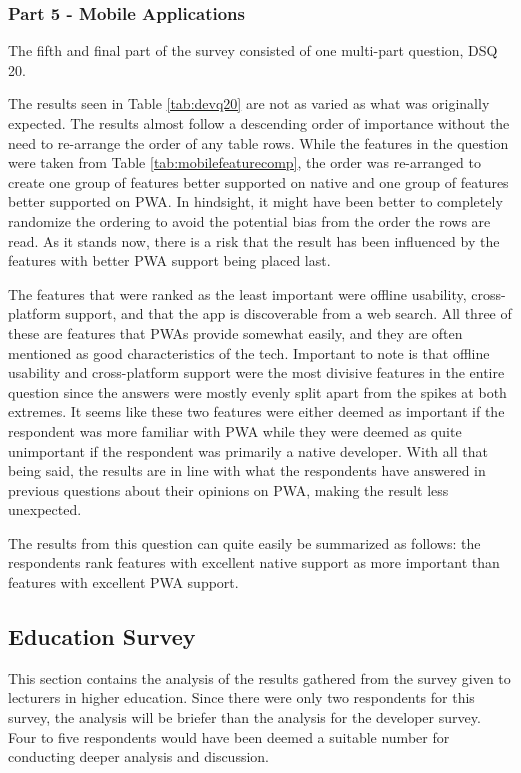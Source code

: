 \documentclass[a4paper,12pt]{article}
\begin{document}
\subsubsection{Part 5 - Mobile Applications}
\label{Analysis_devSurvey_part5}
The fifth and final part of the survey consisted of one multi-part question, DSQ 20.

The results seen in Table \ref{tab:devq20} are not as varied as what was originally expected. The results almost follow a descending order of importance without the need to re-arrange the order of any table rows. While the features in the question were taken from Table \ref{tab:mobilefeaturecomp}, the order was re-arranged to create one group of features better supported on native and one group of features better supported on PWA. In hindsight, it might have been better to completely randomize the ordering to avoid the potential bias from the order the rows are read. As it stands now, there is a risk that the result has been influenced by the features with better PWA support being placed last.

The features that were ranked as the least important were offline usability, cross-platform support, and that the app is discoverable from a web search. All three of these are features that PWAs provide somewhat easily, and they are often mentioned as good characteristics of the tech. Important to note is that offline usability and cross-platform support were the most divisive features in the entire question since the answers were mostly evenly split apart from the spikes at both extremes. It seems like these two features were either deemed as important if the respondent was more familiar with PWA while they were deemed as quite unimportant if the respondent was primarily a native developer. With all that being said, the results are in line with what the respondents have answered in previous questions about their opinions on PWA, making the result less unexpected.

The results from this question can quite easily be summarized as follows: the respondents rank features with excellent native support as more important than features with excellent PWA support.


\subsection{Education Survey}
\label{Analysis_eduSurvey}
This section contains the analysis of the results gathered from the survey given to lecturers in higher education. Since there were only two respondents for this survey, the analysis will be briefer than the analysis for the developer survey. Four to five respondents would have been deemed a suitable number for conducting deeper analysis and discussion.
\end{document}
